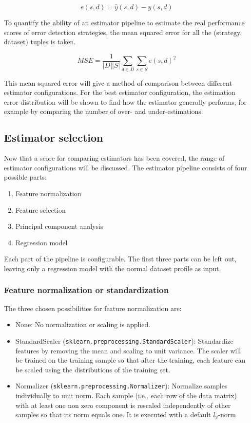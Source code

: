 \begin{equation}
	e(s, d) = \hat{y}(s, d) - y(s, d)
\end{equation}

To quantify the ability of an estimator pipeline to estimate the real performance scores of error detection strategies, the mean squared error for all the (strategy, dataset) tuples is taken. 

\begin{equation}
	MSE = \frac{1}{|D||S|} \sum_{d \in D} \sum_{s \in S} e(s, d)^2
\end{equation}

This mean squared error will give a method of comparison between different estimator configurations. For the best estimator configuration, the estimation error distribution will be shown to find how the estimator generally performs, for example by comparing the number of over- and under-estimations.

\subsection{Estimator selection}
\label{subsec:estimatorselection}
Now that a score for comparing estimators has been covered, the range of estimator configurations will be discussed.
The estimator pipeline consists of four possible parts:
\begin{enumerate}
	\item Feature normalization
	\item Feature selection
	\item Principal component analysis
	\item Regression model
\end{enumerate}

Each part of the pipeline is configurable. The first three parts can be left out, leaving only a regression model with the normal dataset profile as input. 

\subsubsection{Feature normalization or standardization}
The three chosen possibilities for feature normalization are:
\begin{itemize}
	\item None: No normalization or scaling is applied.
	\item StandardScaler (\verb|sklearn.preprocessing.StandardScaler|): Standardize features by removing the mean and scaling to unit variance. The scaler will be trained on the training sample so that after the training, each feature can be scaled using the distributions of the training set.
	\item Normalizer (\verb|sklearn.preprocessing.Normalizer|): Normalize samples individually to unit norm. Each sample (i.e., each row of the data matrix) with at least one non zero component is rescaled independently of other samples so that its norm equals one. It is executed with a default $l_2$-norm
\end{itemize}

